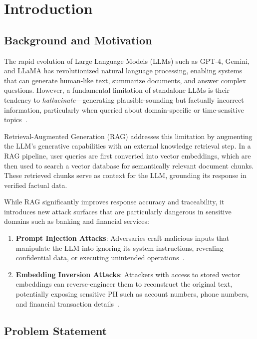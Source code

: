 \chapter{Introduction}

\section{Background and Motivation}

The rapid evolution of Large Language Models (LLMs) such as GPT-4, Gemini, and LLaMA has revolutionized natural language processing, enabling systems that can generate human-like text, summarize documents, and answer complex questions. However, a fundamental limitation of standalone LLMs is their tendency to \textit{hallucinate}---generating plausible-sounding but factually incorrect information, particularly when queried about domain-specific or time-sensitive topics~\cite{lewis2020retrieval}.

Retrieval-Augmented Generation (RAG) addresses this limitation by augmenting the LLM's generative capabilities with an external knowledge retrieval step. In a RAG pipeline, user queries are first converted into vector embeddings, which are then used to search a vector database for semantically relevant document chunks. These retrieved chunks serve as context for the LLM, grounding its response in verified factual data.

While RAG significantly improves response accuracy and traceability, it introduces new attack surfaces that are particularly dangerous in sensitive domains such as banking and financial services:

\begin{enumerate}
    \item \textbf{Prompt Injection Attacks}: Adversaries craft malicious inputs that manipulate the LLM into ignoring its system instructions, revealing confidential data, or executing unintended operations~\cite{perez2022prompt}.
    
    \item \textbf{Embedding Inversion Attacks}: Attackers with access to stored vector embeddings can reverse-engineer them to reconstruct the original text, potentially exposing sensitive PII such as account numbers, phone numbers, and financial transaction details~\cite{song2020information}.
\end{enumerate}

\section{Problem Statement}

